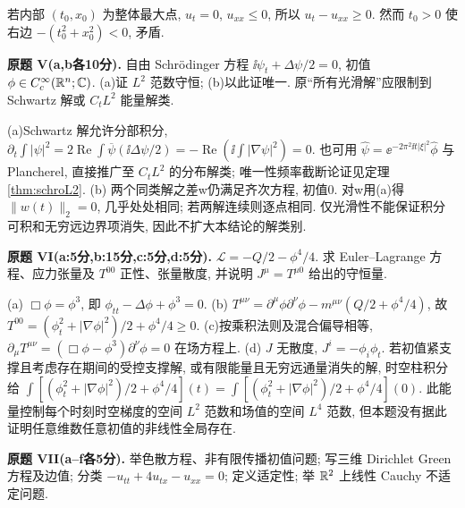 \begin{solution}
若内部 $(t_0,x_0)$ 为整体最大点, $u_t=0$, $u_{xx}\le0$, 所以 $u_t-u_{xx}\ge0$. 然而 $t_0>0$ 使右边 $-(t_0^2+x_0^2)<0$, 矛盾.
\end{solution}
\begin{exercise}\label{exam:fV}
\textbf{原题 V(a,b各10分).} 自由 Schrödinger 方程 $\ii\psi_t+\Delta\psi/2=0$, 初值 $\phi\in C_c^\infty(\mathbb R^n;\mathbb C)$. (a)证 $L^2$ 范数守恒; (b)以此证唯一. 原“所有光滑解”应限制到 Schwartz 解或 $C_tL^2$ 能量解类.
\end{exercise}
\begin{solution}
(a)Schwartz 解允许分部积分,
$\partial_t\int|\psi|^2=2\operatorname{Re}\int\overline\psi(\ii\Delta\psi/2)=-\operatorname{Re}(\ii\int|\nabla\psi|^2)=0$.
也可用 $\widehat\psi=\ee^{-2\pi^2\ii t|\xi|^2}\widehat\phi$ 与 Plancherel, 直接推广至 $C_tL^2$ 的分布解类; 唯一性频率截断论证见定理\ref{thm:schroL2}.
(b) 两个同类解之差w仍满足齐次方程, 初值0. 对w用(a)得 $\|w(t)\|_2=0$, 几乎处处相同; 若两解连续则逐点相同. 仅光滑性不能保证积分可积和无穷远边界项消失, 因此不扩大本结论的解类别.
\end{solution}
\begin{exercise}\label{exam:fVI}
\textbf{原题 VI(a:5分,b:15分,c:5分,d:5分).} $\mathcal L=-Q/2-\phi^4/4$. 求 Euler--Lagrange 方程、应力张量及 $T^{00}$ 正性、张量散度, 并说明 $J^\mu=T^{\mu0}$ 给出的守恒量.
\end{exercise}
\begin{solution}
(a) $\Box\phi=\phi^3$, 即 $\phi_{tt}-\Delta\phi+\phi^3=0$.
(b) $T^{\mu\nu}=\partial^\mu\phi\partial^\nu\phi-m^{\mu\nu}(Q/2+\phi^4/4)$, 故 $T^{00}=(\phi_t^2+|\nabla\phi|^2)/2+\phi^4/4\ge0$.
(c)按乘积法则及混合偏导相等, $\partial_\mu T^{\mu\nu}=(\Box\phi-\phi^3)\partial^\nu\phi=0$ 在场方程上.
(d) $J$ 无散度, $J^i=-\phi_i\phi_t$. 若初值紧支撑且考虑存在期间的受控支撑解, 或有限能量且无穷远通量消失的解, 时空柱积分给
$\int[(\phi_t^2+|\nabla\phi|^2)/2+\phi^4/4](t)=\int[(\phi_t^2+|\nabla\phi|^2)/2+\phi^4/4](0)$.
此能量控制每个时刻时空梯度的空间 $L^2$ 范数和场值的空间 $L^4$ 范数, 但本题没有据此证明任意维数任意初值的非线性全局存在.
\end{solution}
\begin{exercise}\label{exam:fVII}
\textbf{原题 VII(a--f各5分).} 举色散方程、非有限传播初值问题; 写三维 Dirichlet Green 方程及边值; 分类 $-u_{tt}+4u_{tx}-u_{xx}=0$; 定义适定性; 举 $\mathbb R^2$ 上线性 Cauchy 不适定问题.
\end{exercise}
